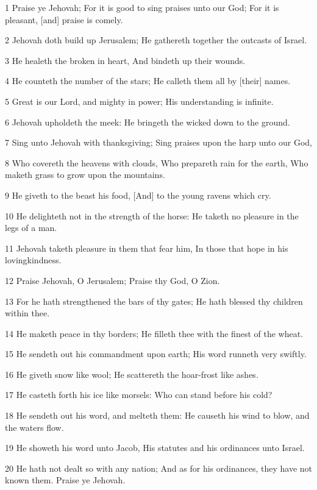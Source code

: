 \par 1 Praise ye Jehovah; For it is good to sing praises unto our God; For it is pleasant, [and] praise is comely.
\par 2 Jehovah doth build up Jerusalem; He gathereth together the outcasts of Israel.
\par 3 He healeth the broken in heart, And bindeth up their wounds.
\par 4 He counteth the number of the stars; He calleth them all by [their] names.
\par 5 Great is our Lord, and mighty in power; His understanding is infinite.
\par 6 Jehovah upholdeth the meek: He bringeth the wicked down to the ground.
\par 7 Sing unto Jehovah with thanksgiving; Sing praises upon the harp unto our God,
\par 8 Who covereth the heavens with clouds, Who prepareth rain for the earth, Who maketh grass to grow upon the mountains.
\par 9 He giveth to the beast his food, [And] to the young ravens which cry.
\par 10 He delighteth not in the strength of the horse: He taketh no pleasure in the legs of a man.
\par 11 Jehovah taketh pleasure in them that fear him, In those that hope in his lovingkindness.
\par 12 Praise Jehovah, O Jerusalem; Praise thy God, O Zion.
\par 13 For he hath strengthened the bars of thy gates; He hath blessed thy children within thee.
\par 14 He maketh peace in thy borders; He filleth thee with the finest of the wheat.
\par 15 He sendeth out his commandment upon earth; His word runneth very swiftly.
\par 16 He giveth snow like wool; He scattereth the hoar-frost like ashes.
\par 17 He casteth forth his ice like morsels: Who can stand before his cold?
\par 18 He sendeth out his word, and melteth them: He causeth his wind to blow, and the waters flow.
\par 19 He showeth his word unto Jacob, His statutes and his ordinances unto Israel.
\par 20 He hath not dealt so with any nation; And as for his ordinances, they have not known them. Praise ye Jehovah.

